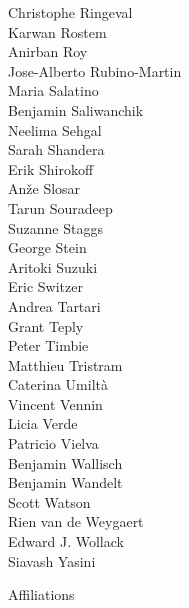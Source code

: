 \documentclass[PICOReport.tex]{subfiles}
\begin{document}
{\begin{multicols}{4}
Christophe Ringeval             \\
Karwan Rostem                   \\
Anirban Roy                     \\
Jose-Alberto Rubino-Martin      \\
Maria Salatino                  \\
Benjamin Saliwanchik            \\
Neelima Sehgal                  \\
Sarah Shandera                  \\
Erik Shirokoff                  \\
An\v{z}e Slosar                 \\
Tarun Souradeep                 \\
Suzanne Staggs                  \\
George Stein                    \\
Aritoki Suzuki                  \\
Eric Switzer                    \\
Andrea Tartari                  \\
Grant Teply                     \\
Peter Timbie                    \\
Matthieu Tristram               \\
Caterina Umilt\`{a}             \\
Vincent Vennin                  \\
Licia Verde                     \\
Patricio Vielva                 \\
Benjamin Wallisch               \\
Benjamin Wandelt                \\
Scott Watson                    \\
Rien van de Weygaert            \\
Edward J. Wollack               \\
Siavash Yasini
\end{multicols}
}

\newpage
\Large  {\centerline {Affiliations}}
\end{document}
